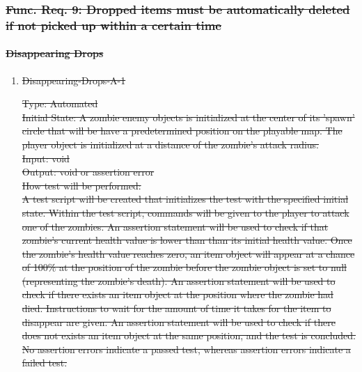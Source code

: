 \documentclass[12pt, titlepage]{article}
\DeclareRobustCommand{\hsout}[1]{\texorpdfstring{\sout{#1}}{#1}}
\begin{document}
\subsubsection{\hsout{Func. Req. 9: Dropped items must be automatically deleted if not picked up within a certain time}}

\paragraph{\hsout{Disappearing Drops}}

\begin{enumerate}

\item{\hsout{Disappearing-Drops-A-1}\\} 

\sout{Type: Automated}\\
					
\sout{Initial State: A zombie enemy objects is initialized at the center of its 'spawn' circle that will be have a predetermined position on the playable map. The player object is initialized at a distance of the zombie's attack radius.}\\
					
\sout{Input: void }\\
					
\sout{Output: void or assertion error} \\
					
\sout{How test will be performed:}\\ \sout{A test script will be created that initializes the test with the specified initial state. Within the test script, commands will be given to the player to attack one of the zombies. An assertion statement will be used to check if that zombie's current health value is lower than than its initial health value. Once the zombie's health value reaches zero, an item object will appear at a chance of 100\% at the position of the zombie before the zombie object is set to null (representing the zombie's death). An assertion statement will be used to check if there exists an item object at the position where the zombie had died. Instructions to wait for the amount of time it takes for the item to disappear are given. An assertion statement will be used to check if there does not exists an item object at the same position, and the test is concluded. No assertion errors indicate a passed test, whereas assertion errors indicate a failed test.}\\

\end{enumerate}
\end{document}
